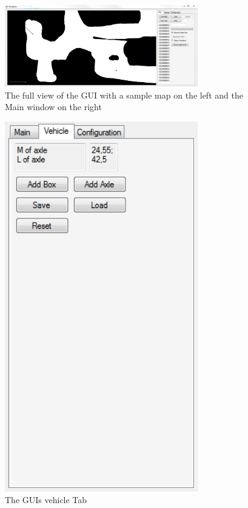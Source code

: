 \begin{figure}[b]
\centering
\includegraphics[width=0.75\textwidth]{./Chapters/Figures/gui_full_main.png}
\caption{The full view of the GUI with a sample map on the left and the Main window on the right\label{pic:gui_full_main}}
\end{figure}

\begin{figure}[b]
\centering
\includegraphics[width=0.75\textwidth]{./Chapters/Figures/gui_vehicle.png}
\caption{The GUIs vehicle Tab\label{pic:gui_vehicle}}
\end{figure}

